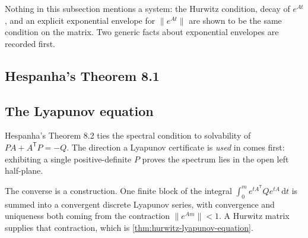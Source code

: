 Nothing in this subsection mentions a system: the Hurwitz condition, decay of $e^{At}$, and an
explicit exponential envelope for $\|e^{At}\|$ are shown to be the same condition on the
matrix. Two generic facts about exponential envelopes are recorded first.








\subsection{Hespanha's Theorem 8.1}



\subsection{The Lyapunov equation}



Hespanha's Theorem 8.2 ties the spectral condition to solvability of $PA + A^{\mathsf T}P = -Q$.
The direction a Lyapunov certificate is \emph{used} in comes first: exhibiting a single
positive-definite $P$ proves the spectrum lies in the open left half-plane.



The converse is a construction. One finite block of the integral
$\int_{0}^{m} e^{tA^{\mathsf T}}Qe^{tA}\,\mathrm{d}t$ is summed into a convergent discrete
Lyapunov series, with convergence and uniqueness both coming from the contraction
$\|e^{Am}\| < 1$. A Hurwitz matrix supplies that contraction, which is
\cref{thm:hurwitz-lyapunov-equation}.

